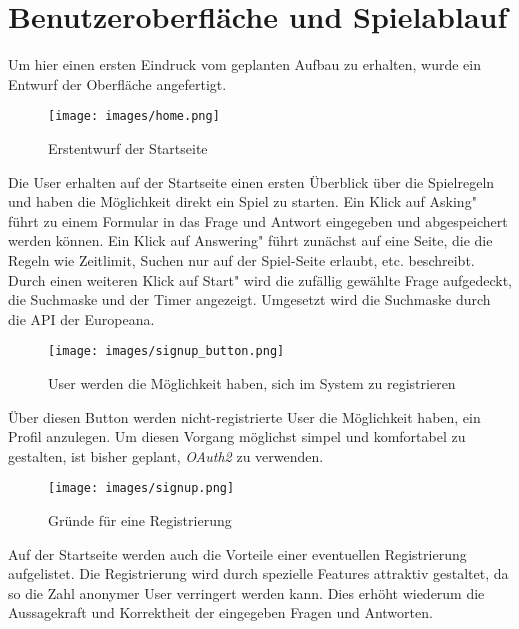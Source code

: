\documentclass{llncs}
\begin{document}
\section{Benutzeroberfläche und Spielablauf}
Um hier einen ersten Eindruck vom geplanten Aufbau zu erhalten, wurde ein Entwurf der Oberfläche angefertigt.
\newline
\begin{figure}{}
\centering
\texttt{[image: images/home.png]}
\caption{Erstentwurf der Startseite}
\end{figure}
\newline
Die User erhalten auf der Startseite einen ersten Überblick über die Spielregeln und haben die Möglichkeit direkt ein Spiel zu starten. Ein Klick auf \glqq Asking" führt zu einem Formular in das Frage und Antwort eingegeben und abgespeichert werden können. Ein Klick auf \glqq Answering" führt zunächst auf eine Seite, die die Regeln wie Zeitlimit, Suchen nur auf der Spiel-Seite erlaubt, etc. beschreibt. Durch einen weiteren Klick auf \glqq Start" wird die zufällig gewählte Frage aufgedeckt, die Suchmaske und der Timer angezeigt. Umgesetzt wird die Suchmaske durch die API der Europeana.

\newpage

\begin{figure}{}
\centering
\texttt{[image: images/signup\_button.png]}
\caption{User werden die Möglichkeit haben, sich im System zu registrieren}
\end{figure}
Über diesen Button werden nicht-registrierte User die Möglichkeit haben, ein Profil anzulegen. Um diesen Vorgang möglichst simpel und komfortabel zu gestalten, ist bisher geplant, \emph{OAuth2} zu verwenden.
\newline

\begin{figure}{}
\centering
\texttt{[image: images/signup.png]}
\caption{Gründe für eine Registrierung}
\end{figure}
Auf der Startseite werden auch die Vorteile einer eventuellen Registrierung aufgelistet. Die Registrierung wird durch spezielle Features attraktiv gestaltet, da so die Zahl anonymer User verringert werden kann. Dies erhöht wiederum die Aussagekraft und Korrektheit der eingegeben Fragen und Antworten.



\newpage
\end{document}

